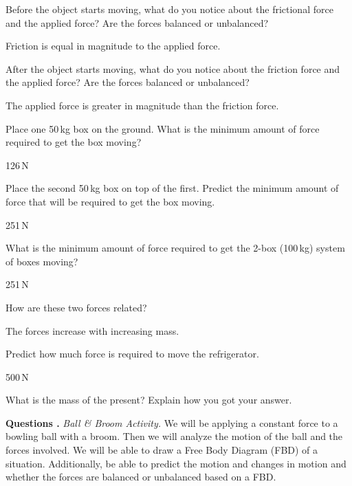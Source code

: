 \documentclass[../main-physics-problems.tex]{subfiles}
\begin{document}
\begin{questions}
\question
Before the object starts moving, what do you notice about the frictional force and the applied force? Are the forces balanced or unbalanced?

\begin{solution}
    Friction is equal in magnitude to the applied force.
\end{solution}

\question 
After the object starts moving, what do you notice about the friction force and the applied force? Are the forces balanced or unbalanced?

\begin{solution}
    The applied force is greater in magnitude than the friction force.
\end{solution}

\question
Place one 50\,kg box on the ground. What is the minimum amount of force required to get the box moving?

\begin{solution}
    126\,N
\end{solution}

\question
Place the second 50\,kg box on top of the first. Predict the minimum amount of force that will be required to get the box moving.

\begin{solution}
    251\,N
\end{solution}

\question
What is the minimum amount of force required to get the 2-box (100\,kg) system of boxes moving?

\begin{solution}
    251\,N
\end{solution}

\question
How are these two forces related?

\begin{solution}
    The forces increase with increasing mass. 
\end{solution}

\question
Predict how much force is required to move the refrigerator.

\begin{solution}
    500\,N
\end{solution}

\question \label{HPDAU}
What is the mass of the present? Explain how you got your answer.



\clearpage

\begin{EnvUplevel}
    \textbf{Questions .} \textit{Ball \& Broom Activity.} We will be applying a constant force to a bowling ball with a broom. Then we will analyze the motion of the ball and the forces involved. We will be able to draw a Free Body Diagram (FBD) of a situation. Additionally, be able to predict the motion and changes in motion and whether the forces are balanced or unbalanced based on a FBD.
\end{EnvUplevel}


\end{questions}
\end{document}

